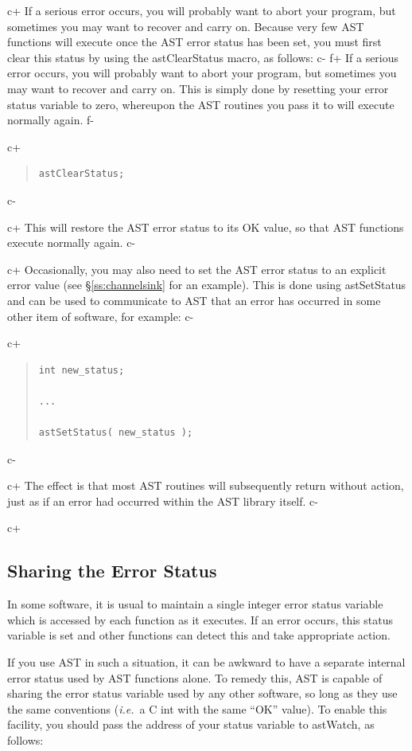 \documentclass[twoside,11pt]{article}
\newcommand{\secref}[1]{\S\ref{#1}}
\newcommand{\secref}[1]{\ref{#1}}
\begin{document}
c+
If a serious error occurs, you will probably want to abort your
program, but sometimes you may want to recover and carry on. Because
very few AST functions will execute once the AST error status has been
set, you must first clear this status by using the astClearStatus
macro, as follows:
c-
f+
If a serious error occurs, you will probably want to abort your
program, but sometimes you may want to recover and carry on.  This is
simply done by resetting your error status variable to zero, whereupon
the AST routines you pass it to will execute normally again.
f-

c+
\begin{quote}
\small
\begin{verbatim}
astClearStatus;
\end{verbatim}
\normalsize
\end{quote}
c-

c+
This will restore the AST error status to its OK value, so that AST
functions execute normally again.
c-

c+
Occasionally, you may also need to set the AST error status to an
explicit error value (see \secref{ss:channelsink} for an
example). This is done using astSetStatus and can be used to
communicate to AST that an error has occurred in some other item of
software, for example:
c-

c+
\begin{quote}
\small
\begin{verbatim}
int new_status;

...

astSetStatus( new_status );
\end{verbatim}
\normalsize
\end{quote}
c-

c+
The effect is that most AST routines will subsequently return without
action, just as if an error had occurred within the AST library
itself.
c-

c+
\subsection{Sharing the Error Status}

In some software, it is usual to maintain a single integer error
status variable which is accessed by each function as it executes. If
an error occurs, this status variable is set and other functions can
detect this and take appropriate action.

If you use AST in such a situation, it can be awkward to have a
separate internal error status used by AST functions alone. To remedy
this, AST is capable of sharing the error status variable used by any
other software, so long as they use the same conventions
({\em{i.e.}}\ a C int with the same ``OK'' value). To enable this
facility, you should pass the address of your status variable to
astWatch, as follows:
\end{document}
